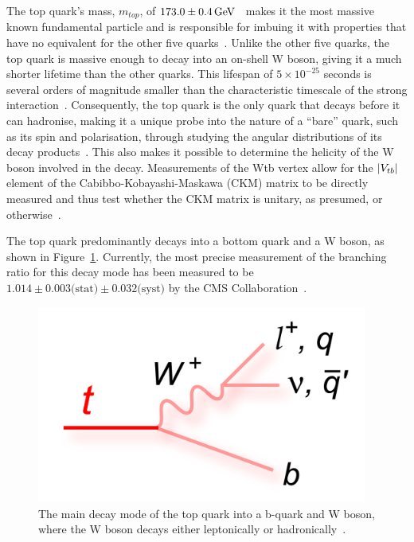 The top quark's mass, $m_{top}$, of $173.0 \pm 0.4 \,\text{Ge\hspace{-.08em}V}$~\cite{Tanabashi:2018oca} makes it the most massive known fundamental particle and is responsible for imbuing it with properties that have no equivalent for the other five quarks~\cite{Tanabashi:2018oca}.
Unlike the other five quarks, the top quark is massive enough to decay into an on-shell W boson, giving it a much shorter lifetime than the other quarks.
This lifespan of $5 \times 10^{-25}$ seconds is several orders of magnitude smaller than the characteristic timescale of the strong interaction~\cite{Quadt}.
Consequently, the top quark is the only quark that decays before it can hadronise, making it a unique probe into the nature of a ``bare'' quark, such as its spin and polarisation, through studying the angular distributions of its decay products~\cite{Khachatryan:2015dzz}.
This also makes it possible to determine the helicity of the W boson involved in the decay.
Measurements of the Wtb vertex allow for the $\lvert V_{tb} \rvert$ element of the Cabibbo-Kobayashi-Maskawa (CKM) matrix to be directly measured and thus test whether the CKM matrix is unitary, as presumed, or otherwise~\cite{Shibata:2008sy}.

The top quark predominantly decays into a bottom quark and a W boson, as shown in Figure~\ref{fig:topDecay}.
Currently, the most precise measurement of the branching ratio for this decay mode has been measured to be $1.014 \pm 0.003 \textrm{(stat)} \pm 0.032 \textrm{(syst)}$ by the CMS Collaboration~\cite{Khachatryan:2014nda}.

\begin{figure}[htbp]
\begin{center}
\includegraphics[width=0.97\textwidth]{figs/top-physics/topDecay.png}
\caption{The main decay mode of the top quark into a b-quark and W boson, where the W boson decays either leptonically or hadronically~\cite{topDiagrams}.}
\label{fig:topDecay}
\end{center}
\end{figure}

